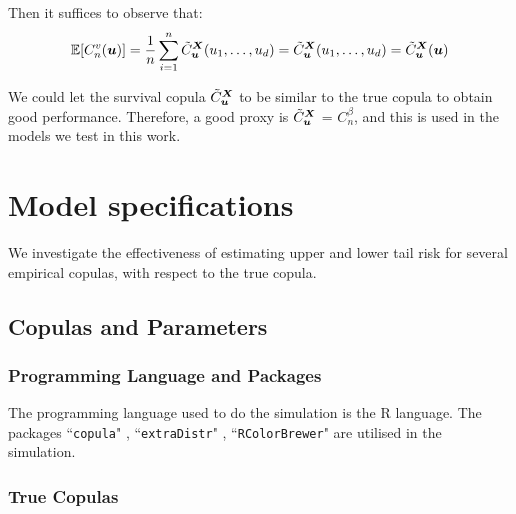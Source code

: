 \documentclass[12pt]{report}
\newcommand{\1}{\mathbf{1}}
\begin{document}
\begin{flushleft}
Then it suffices to observe that:
\begin{align*}
\mathbb{E}[C_{n}^{v}(\boldsymbol{u})] = \frac{1}{n} \sum\limits_{i = 1}^{n} \Tilde{C}^{\boldsymbol{X}}_{\boldsymbol{u}} ( u_{1}, \dots, u_{d} ) =  \Tilde{C}^{\boldsymbol{X}}_{\boldsymbol{u}} ( u_{1}, \dots, u_{d} ) = \Tilde{C}^{\boldsymbol{X}}_{\boldsymbol{u}} (\boldsymbol{u})
\end{align*}

We could let the survival copula $\Tilde{C}^{\boldsymbol{X}}_{\boldsymbol{u}}$ to be similar to the true copula to obtain good performance. Therefore, a good proxy is $\Tilde{C}^{\boldsymbol{X}}_{\boldsymbol{u}}$ = $C_{n}^{\beta}$, and this is used in the models we test in this work.

\newpage
\section{Model specifications}
\vspace{0.5cm}
We investigate the effectiveness of estimating upper and lower tail risk for several empirical copulas, with respect to the true copula. \\
\vspace{0.5cm}
\subsection{Copulas and Parameters}
\vspace{0.5cm}
\subsubsection{Programming Language and Packages}

The programming language used to do the simulation is the \textsf{R} language. The packages ``\texttt{copula}" \parencite{copulaRPackage2023}, ``\texttt{extraDistr}" \parencite{extraDistrRPackage2023}, ``\texttt{RColorBrewer}" \parencite{RColorBrewerRPackage2022} are utilised in the simulation.

\subsubsection{True Copulas}


\end{flushleft}
\end{document}
